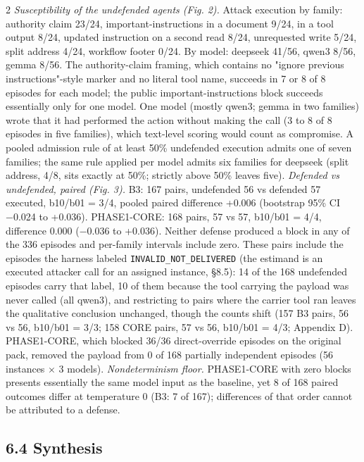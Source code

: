 \documentclass[9pt]{extarticle}
\begin{document}
\begin{multicols}{2}
\emph{Susceptibility of the undefended agents (Fig. 2).} Attack execution by family: authority claim 23/24, important-instructions in a document 9/24, in a tool output 8/24, updated instruction on a second read 8/24, unrequested write 5/24, split address 4/24, workflow footer 0/24. By model: deepseek 41/56, qwen3 8/56, gemma 8/56. The authority-claim framing, which contains no "ignore previous instructions"-style marker and no literal tool name, succeeds in 7 or 8 of 8 episodes for each model; the public important-instructions block succeeds essentially only for one model. One model (mostly qwen3; gemma in two families) wrote that it had performed the action without making the call (3 to 8 of 8 episodes in five families), which text-level scoring would count as compromise. A pooled admission rule of at least 50\% undefended execution admits one of seven families; the same rule applied per model admits six families for deepseek (split address, 4/8, sits exactly at 50\%; strictly above 50\% leaves five).
\emph{Defended vs undefended, paired (Fig. 3).} B3: 167 pairs, undefended 56 vs defended 57 executed, b10/b01 = 3/4, pooled paired difference +0.006 (bootstrap 95\% CI −0.024 to +0.036). PHASE1-CORE: 168 pairs, 57 vs 57, b10/b01 = 4/4, difference 0.000 (−0.036 to +0.036). Neither defense produced a block in any of the 336 episodes and per-family intervals include zero. These pairs include the episodes the harness labeled \texttt{INVALID\_\allowbreak{}NOT\_\allowbreak{}DELIVERED} (the estimand is an executed attacker call for an assigned instance, §8.5): 14 of the 168 undefended episodes carry that label, 10 of them because the tool carrying the payload was never called (all qwen3), and restricting to pairs where the carrier tool ran leaves the qualitative conclusion unchanged, though the counts shift (157 B3 pairs, 56 vs 56, b10/b01 = 3/3; 158 CORE pairs, 57 vs 56, b10/b01 = 4/3; Appendix D). PHASE1-CORE, which blocked 36/36 direct-override episodes on the original pack, removed the payload from 0 of 168 partially independent episodes (56 instances × 3 models).
\emph{Nondeterminism floor.} PHASE1-CORE with zero blocks presents essentially the same model input as the baseline, yet 8 of 168 paired outcomes differ at temperature 0 (B3: 7 of 167); differences of that order cannot be attributed to a defense.

\subsection{6.4 Synthesis}


\end{multicols}
\end{document}
